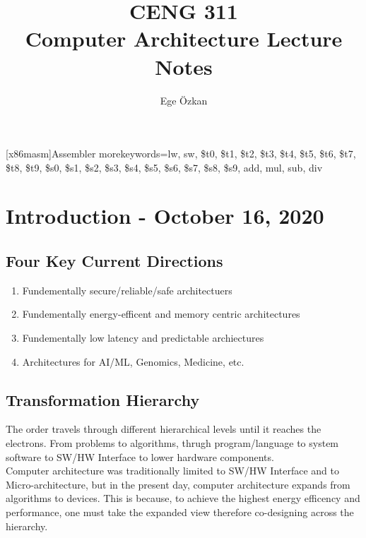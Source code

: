 \documentclass[11pt,a4paper,twocolumn]{book}
\author{Ege Özkan}
\title{CENG 311 \\ \large{Computer Architecture Lecture Notes}}
\begin{document}
\newcommand{\code}[1]{\texttt{#1}}
\newcommand{\cputime}{\ensuremath{\text{CPU Time}}}
\newcommand{\cyclecount}{\text{Cycle Count}}
\newcommand{\cycletime}{\text{Cycle Time}}
\newcommand{\clockrate}{\text{Clock Rate}}
\maketitle
\newcommand{\inscount}{\text{IC}}

   [x86masm]{Assembler} %
   {morekeywords={lw, sw, \$t0, \$t1,
   \$t2, \$t3, \$t4, \$t5, \$t6, \$t7,
   \$t8, \$t9, \$s0, \$s1, \$s2, \$s3,
   \$s4, \$s5, \$s6, \$s7, \$s8, \$s9,
   add, mul, sub, div}} %


\lstset{language=[MISP]Assembler}

\chapter{Introduction - October 16, 2020}

\section{Four Key Current Directions}

\begin{enumerate}
\item Fundementally secure/reliable/safe architectuers
\item Fundementally energy-efficent and memory centric architectures
\item Fundementally low latency and predictable archiectures
\item Architectures for AI/ML, Genomics, Medicine, etc.
\end{enumerate}

\section{Transformation Hierarchy}

The order travels through different hierarchical levels until it reaches the electrons. From problems to algorithms, thrugh program/language to system software to SW/HW Interface to lower hardware components.\\

Computer architecture was traditionally limited to SW/HW Interface and to Micro-architecture, but in the present day, computer architecture expands from algorithms to devices. This is because, to achieve the highest energy efficency and performance, one must take the expanded view therefore co-designing across the hierarchy.\\
\end{document}
